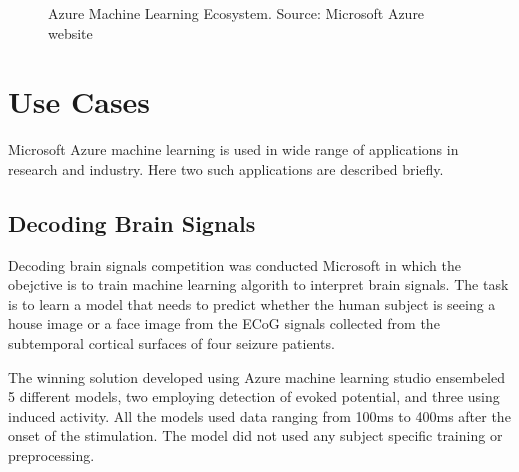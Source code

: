 \documentclass[9pt,twocolumn,twoside]{../../styles/osajnl}
\begin{document}
\begin{figure}[htbp]
\centering
{}
\caption{Azure Machine Learning Ecosystem. \newline Source: Microsoft
  Azure website\cite{www-azureSQLDataWarehouse}}
\label{fig:false-color}
\end{figure}

\section{Use Cases}
Microsoft Azure machine learning is used in wide range of applications
in research and industry. Here two such applications are described
briefly.

\subsection{Decoding Brain Signals}
Decoding brain signals competition\cite{www-cortanaDecodeBrainSignal}
was conducted Microsoft in which the obejctive is to train machine
learning algorith to interpret brain signals. The task is to learn a
model that needs to predict whether the human subject is seeing a
house image or a face image from the ECoG signals collected from the
subtemporal cortical surfaces of four seizure patients.

The winning solution developed using Azure machine learning studio
ensembeled 5 different models, two employing detection of evoked
potential, and three using induced activity. All the models used data
ranging from 100ms to 400ms after the onset of the stimulation. The
model did not used any subject specific training or preprocessing.
\end{document}
